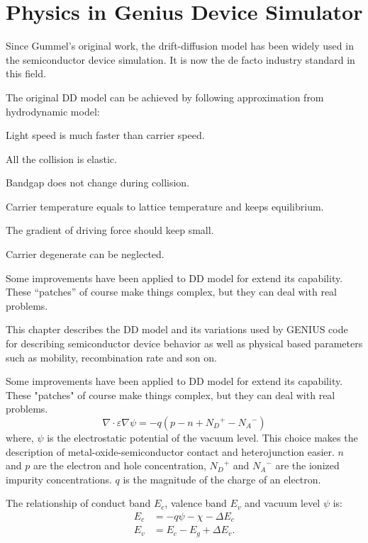 \documentclass[oneside,12pt]{cgd_book}
\begin{document}
\chapter{Physics in Genius Device Simulator}
Since Gummel's original work, the drift-diffusion model has been widely used in the semiconductor device
    simulation. It is now the de facto industry standard in this field.
\par
The original DD model can be achieved by following approximation from hydrodynamic model:
\begin{compactitem}
\item Light speed is much faster than carrier speed.
\item All the collision is elastic.
\item Bandgap does not change during collision.
\item Carrier temperature equals to lattice temperature and keeps equilibrium.
\item The gradient of driving force should keep small.
\item Carrier degenerate can be neglected.
\end{compactitem}

Some improvements have been applied to DD model for extend its capability.
These ``patches'' of course make things complex, but they can deal with real problems.



This chapter describes the DD model and its variations used by GENIUS code for
describing semiconductor device behavior as well as physical based parameters
such as mobility, recombination rate and son on.


Some improvements have been applied to DD model for extend its capability. These "patches" of course make
    things complex, but they can deal with real problems.
\begin{equation}
\nabla \cdot \varepsilon \nabla \psi = - q\left( p - n + {N_D}^+ - {N_A}^- \right)
\end{equation}
where, $\psi$ is the electrostatic potential of the vacuum level. This
      choice makes the description of metal-oxide-semiconductor contact and heterojunction easier.
$n$ and $p$ are the electron and hole concentration, ${N_D}^{+}$
and ${N_A}^{-}$ are the ionized impurity
      concentrations. $q$ is the magnitude of the charge of an electron.
\par
The relationship of conduct band $E_c$, valence band $E_v$ and vacuum level
$\psi$ is:
\begin{align}
  E_c  &=-q\psi-\chi-\Delta E_c \\
  E_v   &=E_c-E_g+\Delta E_v.
\end{align}
\end{document}
